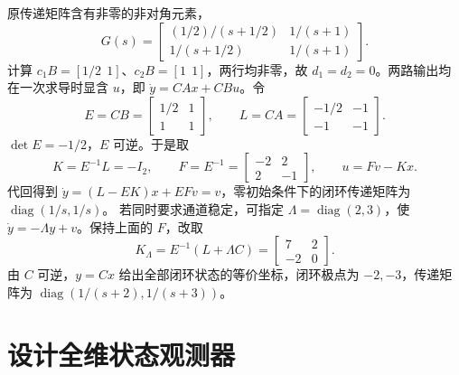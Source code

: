 \sol 原传递矩阵含有非零的非对角元素，
\[
    G(s)=\begin{bmatrix}
        (1/2)/(s+1/2)&1/(s+1)\\
        1/(s+1/2)&1/(s+1)
    \end{bmatrix}.
\]
计算 $c_1B=[1/2\ \ 1]$、$c_2B=[1\ \ 1]$，两行均非零，故 $d_1=d_2=0$。两路输出均在一次求导时显含 $u$，即 $\dot y=CAx+CBu$。令
\[
    E=CB=\begin{bmatrix}1/2&1\\1&1\end{bmatrix},\qquad
    L=CA=\begin{bmatrix}-1/2&-1\\-1&-1\end{bmatrix}.
\]
$\det E=-1/2$，$E$ 可逆。于是取
\[
    K=E^{-1}L=-I_2,\qquad F=E^{-1}=\begin{bmatrix}-2&2\\2&-1\end{bmatrix},
    \qquad u=Fv-Kx .
\]
代回得到 $\dot y=(L-EK)x+EFv=v$，零初始条件下的闭环传递矩阵为 $\operatorname{diag}(1/s,1/s)$。
若同时要求通道稳定，可指定 $\Lambda=\operatorname{diag}(2,3)$，使 $\dot y=-\Lambda y+v$。保持上面的 $F$，改取
\[
    K_\Lambda=E^{-1}(L+\Lambda C)
             =\begin{bmatrix}7&2\\-2&0\end{bmatrix}.
\]
由 $C$ 可逆，$y=Cx$ 给出全部闭环状态的等价坐标，闭环极点为 $-2,-3$，传递矩阵为 $\operatorname{diag}(1/(s+2),1/(s+3))$。

\section{设计全维状态观测器}



